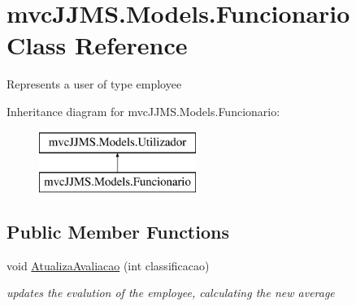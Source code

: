 \hypertarget{classmvc_j_j_m_s_1_1_models_1_1_funcionario}{}\section{mvc\+J\+J\+M\+S.\+Models.\+Funcionario Class Reference}
\label{classmvc_j_j_m_s_1_1_models_1_1_funcionario}


Represents a user of type employee  


Inheritance diagram for mvc\+J\+J\+M\+S.\+Models.\+Funcionario\+:\begin{figure}[H]
\begin{center}
\leavevmode
\includegraphics[height=2.000000cm]{classmvc_j_j_m_s_1_1_models_1_1_funcionario}
\end{center}
\end{figure}
\subsection*{Public Member Functions}
\begin{DoxyCompactItemize}
\item 
void \mbox{\hyperlink{classmvc_j_j_m_s_1_1_models_1_1_funcionario_ad694fad2fe71c45f64f40f07a0732f22}{Atualiza\+Avaliacao}} (int classificacao)
\begin{DoxyCompactList}\small\item\em updates the evalution of the employee, calculating the new average \end{DoxyCompactList}\end{DoxyCompactItemize}

